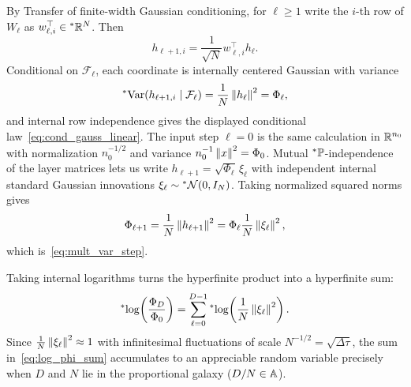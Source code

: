 \begin{proofsketch}
By Transfer of finite-width Gaussian conditioning, for $\ell \ge 1$ write the $i$-th row of $W_\ell$ as $w_{\ell,i}^\top \in {}^*\mathbb{R}^N$. Then
\begin{equation}\label{eq:coord_linear_step}
h_{\ell+1,i} = \frac{1}{\sqrt{N}} w_{\ell,i}^\top h_\ell.
\end{equation}
Conditional on $\mathcal{F}_\ell$, each coordinate is internally centered Gaussian with variance
\begin{equation}\label{eq:coord_linear_var}
{}^*\!\operatorname{Var}(h_{\ell+1,i} \mid \mathcal{F}_\ell) = \frac{1}{N}\left\lVert h_\ell \right\rVert^2 = \Phi_\ell,
\end{equation}
and internal row independence gives the displayed conditional law~\eqref{eq:cond_gauss_linear}. The input step $\ell = 0$ is the same calculation in $\mathbb{R}^{n_0}$ with normalization $n_0^{-1/2}$ and variance $n_0^{-1}\left\lVert x \right\rVert^2 = \Phi_0$. Mutual ${}^*\mathbb{P}$-independence of the layer matrices lets us write $h_{\ell+1} = \sqrt{\Phi_\ell}\,\xi_\ell$ with independent internal standard Gaussian innovations $\xi_\ell \sim {}^*\mathcal{N}(0, I_N)$. Taking normalized squared norms gives
\begin{equation}\label{eq:phi_xi_norm}
\Phi_{\ell+1} = \frac{1}{N}\left\lVert h_{\ell+1} \right\rVert^2 = \Phi_\ell \frac{1}{N}\left\lVert \xi_\ell \right\rVert^2,
\end{equation}
which is~\eqref{eq:mult_var_step}.
\end{proofsketch}

Taking internal logarithms turns the hyperfinite product into a hyperfinite sum:
\begin{equation}\label{eq:log_phi_sum}
{}^*\!\log\!\left(\frac{\Phi_D}{\Phi_0}\right) = \sum_{\ell=0}^{D-1} {}^*\!\log\!\left(\frac{1}{N}\left\lVert \xi_\ell \right\rVert^2\right).
\end{equation}
Since $\frac{1}{N}\left\lVert \xi_\ell \right\rVert^2 \approx 1$ with infinitesimal fluctuations of scale $N^{-1/2} = \sqrt{\Delta\tau}$, the sum in~\eqref{eq:log_phi_sum} accumulates to an appreciable random variable precisely when $D$ and $N$ lie in the proportional galaxy ($D/N \in \mathbb{A}$).

